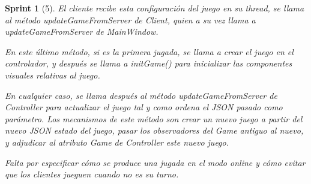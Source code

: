 \documentclass{article}
\theoremstyle{break}
\newtheorem*{sprint}{Sprint}
\begin{document}
\begin{sprint}[5]
El cliente recibe esta configuración del juego en su thread, se llama al método updateGameFromServer de Client, quien a su vez llama a updateGameFromServer de MainWindow.

En este último método, si es la primera jugada, se llama a crear el juego en el controlador, y después se llama a initGame() para inicializar las componentes visuales relativas al juego.

En cualquier caso, se llama después al método updateGameFromServer de Controller para actualizar el juego tal y como ordena el JSON pasado como parámetro. Los mecanismos de este método son crear un nuevo juego a partir del nuevo JSON estado del juego, pasar los observadores del Game antiguo al nuevo, y adjudicar al atributo Game de Controller este nuevo juego.

Falta por especificar cómo se produce una jugada en el modo online y cómo evitar que los clientes jueguen cuando no es su turno.


\end{sprint}
\end{document}
